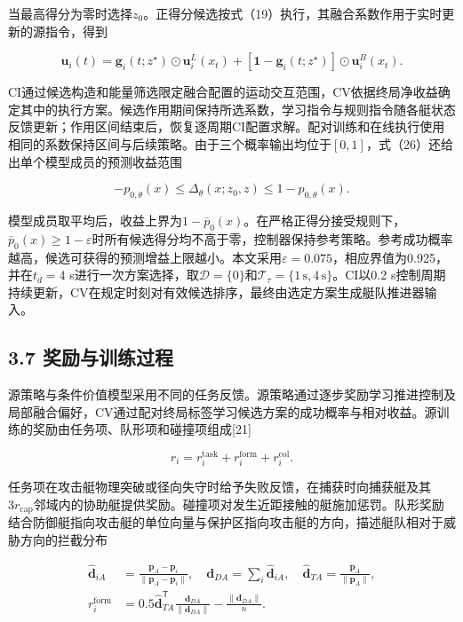 \documentclass[UTF8,a4paper,zihao=5,fontset=none]{ctexart}
\begin{document}
当最高得分为零时选择\(z_0\)。正得分候选按式（19）执行，其融合系数作用于实时更新的源指令，得到

\[
\boldsymbol u_i(t)
=\boldsymbol g_i(t;z^\star)\odot\boldsymbol u_i^L(x_t)
+[\boldsymbol1-\boldsymbol g_i(t;z^\star)]\odot\boldsymbol u_i^B(x_t).
\tag{33}
\]

CI通过候选构造和能量筛选限定融合配置的运动交互范围，CV依据终局净收益确定其中的执行方案。候选作用期间保持所选系数，学习指令与规则指令随各艇状态反馈更新；作用区间结束后，恢复逐周期CI配置求解。配对训练和在线执行使用相同的系数保持区间与后续策略。由于三个概率输出均位于\([0,1]\)，式（26）还给出单个模型成员的预测收益范围

\[
-p_{0,\theta}(x)\leq\Delta_\theta(x;z_0,z)\leq1-p_{0,\theta}(x).
\tag{34}
\]

模型成员取平均后，收益上界为\(1-\bar p_0(x)\)。在严格正得分接受规则下，\(\bar p_0(x)\geq1-\varepsilon\)时所有候选得分均不高于零，控制器保持参考策略。参考成功概率越高，候选可获得的预测增益上限越小。本文采用\(\varepsilon=0.075\)，相应界值为0.925，并在\(t_d=4\) s进行一次方案选择，取\(\mathcal D=\{0\}\)和\(\mathcal T_\tau=\{1\,\mathrm s,4\,\mathrm s\}\)。CI以0.2 s控制周期持续更新，CV在规定时刻对有效候选排序，最终由选定方案生成艇队推进器输入。

\subsection*{3.7 奖励与训练过程}

源策略与条件价值模型采用不同的任务反馈。源策略通过逐步奖励学习推进控制及局部融合偏好，CV通过配对终局标签学习候选方案的成功概率与相对收益。源训练的奖励由任务项、队形项和碰撞项组成{[}21{]}

\[
r_i=r_i^{\mathrm{task}}+r_i^{\mathrm{form}}+r_i^{\mathrm{col}}.
\tag{35}
\]

任务项在攻击艇物理突破或径向失守时给予失败反馈，在捕获时向捕获艇及其\(3r_{\mathrm{cap}}\)邻域内的协助艇提供奖励。碰撞项对发生近距接触的艇施加惩罚。队形奖励结合防御艇指向攻击艇的单位向量与保护区指向攻击艇的方向，描述艇队相对于威胁方向的拦截分布

\[
\begin{aligned}
\widehat{\boldsymbol d}_{iA}
&=\frac{\boldsymbol p_A-\boldsymbol p_i}{\|\boldsymbol p_A-\boldsymbol p_i\|},
\quad
\boldsymbol d_{DA}=\sum_i\widehat{\boldsymbol d}_{iA},
\quad
\widehat{\boldsymbol d}_{TA}=\frac{\boldsymbol p_A}{\|\boldsymbol p_A\|},\\
r_i^{\mathrm{form}}
&=0.5\widehat{\boldsymbol d}_{TA}^{\mathsf T}
\frac{\boldsymbol d_{DA}}{\|\boldsymbol d_{DA}\|}
-\frac{\|\boldsymbol d_{DA}\|}{n}.
\end{aligned}
\tag{36}
\]
\end{document}
